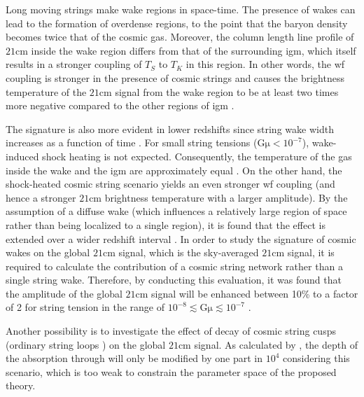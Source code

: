 \documentclass[12pt, TexShade, letterpaper]{report}
\begin{document}
Long moving strings make wake regions in space-time. The presence of wakes can lead to the formation of overdense regions, to the point that the baryon density becomes twice that of the cosmic gas. Moreover, the column length line profile of $\mathrm{21cm}$ inside the wake region differs from that of the surrounding \gls{igm}, which itself results in a stronger coupling of $T_S$ to $T_K$ in this region. In other words, the \gls{wf} coupling is stronger in the presence of cosmic strings and causes the brightness temperature of the $\mathrm{21cm}$ signal from the wake region to be at least two times more negative compared to the other regions of \gls{igm} \cite{cosmic_string_oscar}. \par
The signature is also more evident in lower redshifts since string wake width increases as a function of time \cite{cosmic_string_brandenberger}. For small string tensions ($\mathrm{G\mu< 10 ^{-7}}$), wake-induced shock heating is not expected. Consequently, the temperature of the gas inside the wake and the \gls{igm} are approximately equal \cite{cosmic_string_oscar}. On the other hand, the shock-heated cosmic string scenario yields an even stronger \gls{wf} coupling (and hence a stronger $\mathrm{21cm}$ brightness temperature with a larger amplitude). By the assumption of a diffuse wake (which influences a relatively large region of space rather than being localized to a single region), it is found that the effect is extended over a wider redshift interval \cite{oscar_robert_shock, WF_effect_oscar, cosmic_string_oscar}. In order to study the signature of cosmic wakes on the global $\mathrm{21cm}$ signal, which is the sky-averaged $\mathrm{21cm}$ signal, it is required to calculate the contribution of a cosmic string network rather than a single string wake. Therefore, by conducting this evaluation, it was found that the amplitude of the global $\mathrm{21cm}$ signal will be enhanced between 10\% to a factor of 2 for string tension in the range of $\mathrm{10^{-8}\lesssim G\mu\lesssim10^{-7}}$  \cite{cosmic_string_oscar}.\par

Another possibility is to investigate the effect of decay of cosmic string cusps (ordinary string loops \cite{massive_BH}) on the global $\mathrm{21cm}$ signal. As calculated by \cite{robert_cusps}, the depth of the absorption through will only be modified by one part in $10^4$ considering this scenario, which is too weak to constrain the parameter space of the proposed theory.\par
\end{document}
